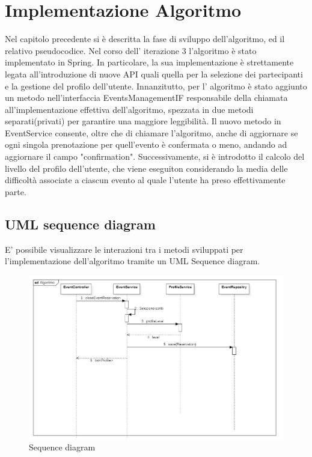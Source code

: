 \section{Implementazione Algoritmo}

Nel capitolo precedente si è descritta la fase di sviluppo dell'algoritmo, ed il relativo pseudocodice.
Nel corso dell' iterazione 3 l'algoritmo è stato implementato in Spring. In particolare, la sua implementazione è strettamente legata
all'introduzione di nuove API quali quella per la selezione dei partecipanti e la gestione del profilo dell'utente.
Innanzitutto, per l' algoritmo è stato aggiunto un metodo nell'interfaccia EventsManagementIF responsabile della chiamata all'implementazione
effettiva dell'algoritmo, spezzata in due metodi separati(privati) per garantire una maggiore leggibilità. Il nuovo metodo
in EventService consente, oltre che di chiamare l'algoritmo, anche di aggiornare se ogni singola prenotazione per quell'evento 
è confermata o meno, andando ad aggiornare il campo "confirmation".
Successivamente, si è introdotto il calcolo del livello del profilo dell'utente, che viene eseguiton considerando la media delle difficoltà
associate a ciascun evento al quale l'utente ha preso effettivamente parte.

\subsection{UML sequence diagram}

E' possibile visualizzare le interazioni tra i metodi sviluppati per l'implementazione dell'algoritmo tramite un UML Sequence diagram.

\begin{center}
\begin{figure}[h!]
    \includegraphics[width=0.7\linewidth]{Iterazione 3/images/sequence_diagram.png}
    \caption{Sequence diagram}\label{fig:seq}
  \end{figure}
\end{center}
